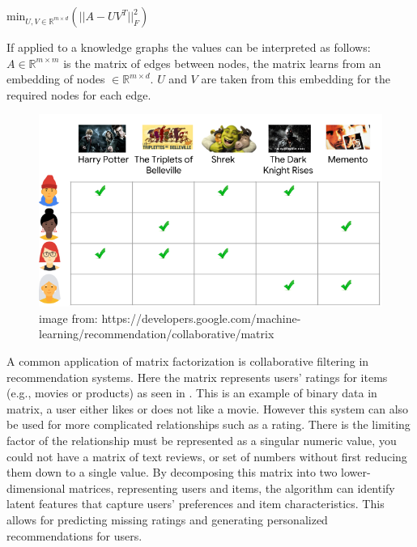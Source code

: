 \documentclass{l4proj}
\begin{document}
\begin{center}
    $\text{min}_{U,V\in \mathbb{R}^{m\times d}}\left (||A - UV^T||_{F}^{2}\right )$
\end{center}

If applied to a knowledge graphs the values can be interpreted as follows: $A \in \mathbb{R}^{m\times m}$ is the matrix of edges between nodes, the matrix learns from an embedding of nodes $ \in \mathbb{R}^{m\times d}$. $U$ and $V$ are taken from this embedding for the required nodes for each edge. 

\begin{figure}[h]
    \centering
    \includegraphics[width=\linewidth]{images/matrix_fact_example.png}
    \caption{image from: https://developers.google.com/machine-learning/recommendation/collaborative/matrix}
    \label{fig:matrix_fact_example}
\end{figure}

A common application of matrix factorization is collaborative filtering in recommendation systems. Here the matrix represents users' ratings for items (e.g., movies or products) as seen in . This is an example of binary data in matrix, a user either likes or does not like a movie. However this system can also be used for more complicated relationships such as a rating. There is the limiting factor of the relationship must be represented as a singular numeric value, you could not have a matrix of text reviews, or set of numbers without first reducing them down to a single value. By decomposing this matrix into two lower-dimensional matrices, representing users and items, the algorithm can identify latent features that capture users' preferences and item characteristics. This allows for predicting missing ratings and generating personalized recommendations for users. \\
\end{document}
